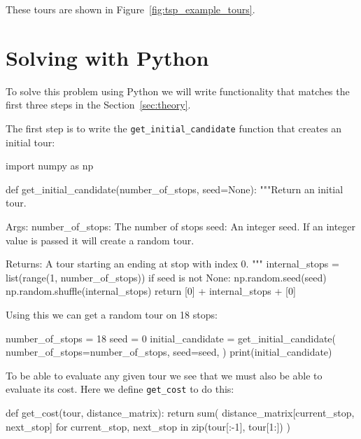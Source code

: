 These tours are shown in Figure~\ref{fig:tsp_example_tours}.

\section{Solving with Python}\label{sec:solving-with-python}

To solve this problem using Python we will write functionality that matches the
first three steps in the Section~\ref{sec:theory}.

The first step is to write the \texttt{get_initial_candidate}
function that creates an initial tour:

\begin{pyin}
import numpy as np


def get_initial_candidate(number_of_stops, seed=None):
    """Return an initial tour.

    Args:
        number_of_stops: The number of stops
        seed: An integer seed. If an integer value is
              passed it will create a random tour.

    Returns:
        A tour starting an ending at stop with index 0.
    """
    internal_stops = list(range(1, number_of_stops))
    if seed is not None:
        np.random.seed(seed)
        np.random.shuffle(internal_stops)
    return [0] + internal_stops + [0]
\end{pyin}

Using this we can get a random tour on 18 stops:

\begin{pyin}
number_of_stops = 18
seed = 0
initial_candidate = get_initial_candidate(
    number_of_stops=number_of_stops,
    seed=seed,
)
print(initial_candidate)
\end{pyin}

\begin{pyout}
[0, 2, 7, 9, 10, 14, 5, 3, 15, 11, 8, 17, 12, 4, 1, 6, 16, 13, 0]
\end{pyout}

To be able to evaluate any given tour we see that we must also be able to
evaluate its cost. Here we define \texttt{get_cost} to do this:

\begin{pyin}
def get_cost(tour, distance_matrix):
    return sum(
        distance_matrix[current_stop, next_stop]
        for current_stop, next_stop in
        zip(tour[:-1], tour[1:])
    )
\end{pyin}

